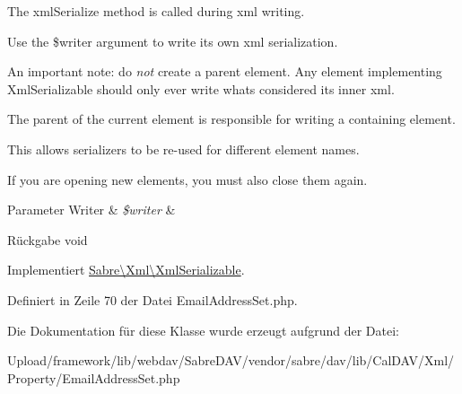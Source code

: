The xml\+Serialize method is called during xml writing.

Use the \$writer argument to write its own xml serialization.

An important note\+: do {\itshape not} create a parent element. Any element implementing Xml\+Serializable should only ever write what\textquotesingle{}s considered its \textquotesingle{}inner xml\textquotesingle{}.

The parent of the current element is responsible for writing a containing element.

This allows serializers to be re-\/used for different element names.

If you are opening new elements, you must also close them again.


\begin{DoxyParams}[1]{Parameter}
Writer & {\em \$writer} & \\
\hline
\end{DoxyParams}
\begin{DoxyReturn}{Rückgabe}
void 
\end{DoxyReturn}


Implementiert \mbox{\hyperlink{interface_sabre_1_1_xml_1_1_xml_serializable_aa78f3ee43aa699be8347181653a53d8c}{Sabre\textbackslash{}\+Xml\textbackslash{}\+Xml\+Serializable}}.



Definiert in Zeile 70 der Datei Email\+Address\+Set.\+php.



Die Dokumentation für diese Klasse wurde erzeugt aufgrund der Datei\+:\begin{DoxyCompactItemize}
\item 
Upload/framework/lib/webdav/\+Sabre\+D\+A\+V/vendor/sabre/dav/lib/\+Cal\+D\+A\+V/\+Xml/\+Property/Email\+Address\+Set.\+php\end{DoxyCompactItemize}
